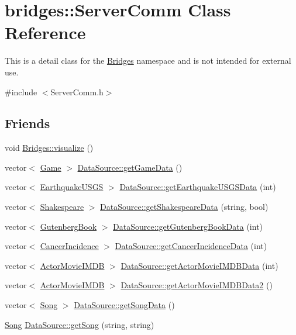 \hypertarget{classbridges_1_1_server_comm}{}\section{bridges\+:\+:Server\+Comm Class Reference}
\label{classbridges_1_1_server_comm}


This is a detail class for the \hyperlink{namespacebridges_1_1_bridges}{Bridges} namespace and is not intended for external use.  




{\ttfamily \#include $<$Server\+Comm.\+h$>$}

\subsection*{Friends}
\begin{DoxyCompactItemize}
\item 
void \hyperlink{classbridges_1_1_server_comm_a0a9e3be9faab475909293766dcda4779}{Bridges\+::visualize} ()
\item 
vector$<$ \hyperlink{classbridges_1_1_game}{Game} $>$ \hyperlink{classbridges_1_1_server_comm_aaf9715981dcd976f93624bd3aa22183f}{Data\+Source\+::get\+Game\+Data} ()
\item 
vector$<$ \hyperlink{classbridges_1_1_earthquake_u_s_g_s}{Earthquake\+U\+S\+G\+S} $>$ \hyperlink{classbridges_1_1_server_comm_a465a9593399d31b531e61b878a8134b2}{Data\+Source\+::get\+Earthquake\+U\+S\+G\+S\+Data} (int)
\item 
vector$<$ \hyperlink{classbridges_1_1_shakespeare}{Shakespeare} $>$ \hyperlink{classbridges_1_1_server_comm_a1f240eea3d39812606c0b3d10bdc757c}{Data\+Source\+::get\+Shakespeare\+Data} (string, bool)
\item 
vector$<$ \hyperlink{classbridges_1_1_gutenberg_book}{Gutenberg\+Book} $>$ \hyperlink{classbridges_1_1_server_comm_a8daad6bf2db8bf4f0b0f9914022b6aa4}{Data\+Source\+::get\+Gutenberg\+Book\+Data} (int)
\item 
vector$<$ \hyperlink{classbridges_1_1_cancer_incidence}{Cancer\+Incidence} $>$ \hyperlink{classbridges_1_1_server_comm_a206da9499372409063d2abe5d1e9bce0}{Data\+Source\+::get\+Cancer\+Incidence\+Data} (int)
\item 
vector$<$ \hyperlink{classbridges_1_1_actor_movie_i_m_d_b}{Actor\+Movie\+I\+M\+D\+B} $>$ \hyperlink{classbridges_1_1_server_comm_aeea4f9e05ded118d657ac8ba9e66f22d}{Data\+Source\+::get\+Actor\+Movie\+I\+M\+D\+B\+Data} (int)
\item 
vector$<$ \hyperlink{classbridges_1_1_actor_movie_i_m_d_b}{Actor\+Movie\+I\+M\+D\+B} $>$ \hyperlink{classbridges_1_1_server_comm_a19c19c0812754ec276dabbf88d5cedaf}{Data\+Source\+::get\+Actor\+Movie\+I\+M\+D\+B\+Data2} ()
\item 
vector$<$ \hyperlink{classbridges_1_1_song}{Song} $>$ \hyperlink{classbridges_1_1_server_comm_ada47f365ba4e6c3ef6dbca3afdd20b3f}{Data\+Source\+::get\+Song\+Data} ()
\item 
\hyperlink{classbridges_1_1_song}{Song} \hyperlink{classbridges_1_1_server_comm_a73eb84d47c0786146b4baceb9d208ea3}{Data\+Source\+::get\+Song} (string, string)
\end{DoxyCompactItemize}


